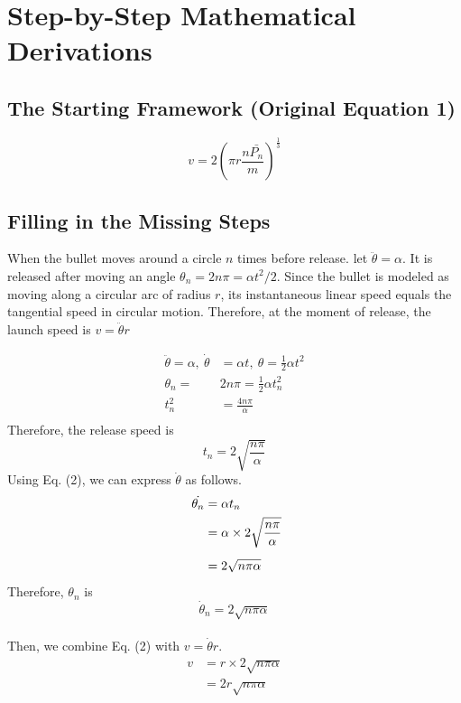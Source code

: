 \documentclass[11pt,letterpaper]{article}
\begin{document}
\section{Step-by-Step Mathematical Derivations}

\subsection{The Starting Framework (Original Equation 1)}
\begin{equation}
v = 2(\pi r \frac{n\bar{P_n}}{m})^\frac{1}{3}
\end{equation}

\subsection{Filling in the Missing Steps}
When the bullet moves around a circle $n$ times before release. let $\ddot{\theta} = \alpha$. It is released after moving an angle $\theta_n = 2n\pi = \alpha t^2/2$. Since the bullet is modeled as moving along a circular arc of radius $r$, its instantaneous linear speed equals the tangential speed in circular motion. Therefore, at the moment of release, the launch speed is $v=\ddot{\theta}r$

\begin{align*}
    \ddot{\theta}=\alpha ,\ \dot{\theta}&=\alpha t ,\ \theta = \frac{1}{2}\alpha t^2\\
    \theta_n = &2n\pi = \frac{1}{2}\alpha t_n^2\\[0.5em]
    t_n^2 &= \frac{4n\pi}{\alpha}\\
\end{align*}
Therefore, the release speed is\\
\begin{equation}
t_n = 2\sqrt{\frac{n\pi}{\alpha}}
\end{equation}
Using Eq. (2), we can express $\dot{\theta}$ as follows.\\
\begin{align*}
\ \dot{\theta_n} &= \alpha t_n\\
&= \alpha\times 2\sqrt{n\pi\over{\alpha}}\\[0.5em]
&= 2\sqrt{n\pi\alpha}
\end{align*}
Therefore, $\theta_n$ is
\\
\begin{equation}
\dot\theta_n = 2\sqrt{n\pi\alpha}
\end{equation}
\\
Then, we combine Eq. (2) with $v=\dot{\theta} r$.
\begin{align*}
v 
&= r \times 2\sqrt{n\pi \alpha}\\[0.5em]
&= 2r\sqrt{n\pi\alpha}
\end{align*}
\end{document}
